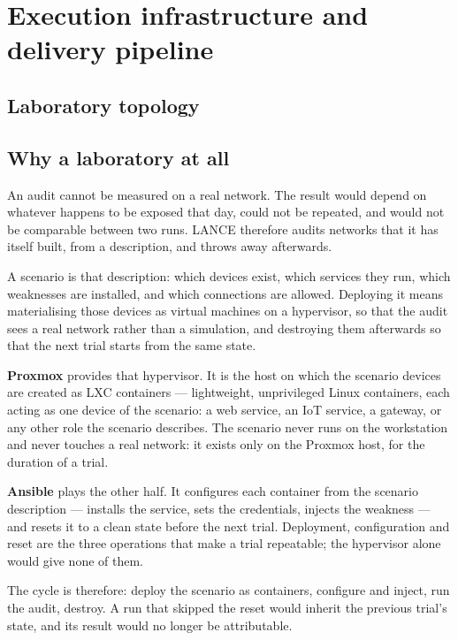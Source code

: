 \section{Execution infrastructure and delivery pipeline}
\label{sec:infrastructure}

\subsection{Laboratory topology}

\subsection{Why a laboratory at all}
\label{sec:proxmox}

An audit cannot be measured on a real network. The result would depend on whatever
happens to be exposed that day, could not be repeated, and would not be
comparable between two runs. LANCE therefore audits networks that it has itself
built, from a description, and throws away afterwards.

A scenario is that description: which devices exist, which services they run,
which weaknesses are installed, and which connections are allowed. Deploying it
means materialising those devices as virtual machines on a hypervisor, so that the
audit sees a real network rather than a simulation, and destroying them afterwards
so that the next trial starts from the same state.

\textbf{Proxmox} provides that hypervisor. It is the host on which the scenario
devices are created as LXC containers --- lightweight, unprivileged Linux
containers, each acting as one device of the scenario: a web service, an IoT
service, a gateway, or any other role the scenario describes. The scenario never
runs on the workstation and never touches a real network: it exists only on the
Proxmox host, for the duration of a trial.

\textbf{Ansible} plays the other half. It configures each container from the
scenario description --- installs the service, sets the credentials, injects the
weakness --- and resets it to a clean state before the next trial. Deployment,
configuration and reset are the three operations that make a trial repeatable; the
hypervisor alone would give none of them.

The cycle is therefore: deploy the scenario as containers, configure and inject,
run the audit, destroy. A run that skipped the reset would inherit the previous
trial's state, and its result would no longer be attributable.

